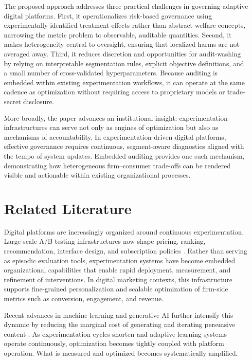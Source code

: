 \documentclass[11pt,letterpaper,english]{article}
\theoremstyle{definition}
\theoremstyle{definition}
\begin{document}
\begin{bibunit}
The proposed approach addresses three practical challenges in governing adaptive digital platforms. First, it operationalizes risk-based governance using experimentally identified treatment effects rather than abstract welfare concepts, narrowing the metric problem to observable, auditable quantities. Second, it makes heterogeneity central to oversight, ensuring that localized harms are not averaged away. Third, it reduces discretion and opportunities for audit-washing by relying on interpretable segmentation rules, explicit objective definitions, and a small number of cross-validated hyperparameters. Because auditing is embedded within existing experimentation workflows, it can operate at the same cadence as optimization without requiring access to proprietary models or trade-secret disclosure.

More broadly, the paper advances an institutional insight: experimentation infrastructures can serve not only as engines of optimization but also as mechanisms of accountability. In experimentation-driven digital platforms, effective governance requires continuous, segment-aware diagnostics aligned with the tempo of system updates. Embedded auditing provides one such mechanism, demonstrating how heterogeneous firm–consumer trade-offs can be rendered visible and actionable within existing organizational processes.


\section{Related Literature}
\label{sec:related_lit}

Digital platforms are increasingly organized around continuous experimentation. Large-scale A/B testing infrastructures now shape pricing, ranking, recommendation, interface design, and subscription policies \citep{kohavi2020trustworthy, auer2021_continuous_experimentation, quinn2024_ab_slr}. Rather than serving as episodic evaluation tools, experimentation systems have become embedded organizational capabilities that enable rapid deployment, measurement, and refinement of interventions. In digital marketing contexts, this infrastructure supports fine-grained personalization and scalable optimization of firm-side metrics such as conversion, engagement, and revenue.

Recent advances in machine learning and generative AI further intensify this dynamic by reducing the marginal cost of generating and iterating persuasive content \citep{ye2025lola}. As experimentation cycles shorten and adaptive learning systems operate continuously, optimization becomes tightly coupled with platform operation. What is measured and optimized becomes systematically amplified.


\end{bibunit}
\end{document}
